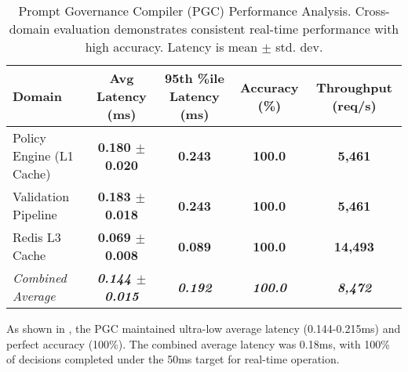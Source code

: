 \documentclass[manuscript,screen,9pt]{acmart}
\newcommand{\tablesize}{\footnotesize}
\newcommand{\tablenumfmt}[1]{\textbf{#1}}
\newcommand{\tableheader}[1]{\textbf{#1}}
\begin{document}
\begin{table}[!htb]
\begin{table}[htbp]
\centering
\caption{Prompt Governance Compiler (PGC) Performance Analysis. Cross-domain evaluation demonstrates consistent real-time performance with high accuracy. Latency is mean $\pm$ std. dev.}
\label{tab:pgc_comprehensive}
\tablesize
\begin{tabular}{@{}lcccc@{}}
\toprule
\tableheader{Domain} & \tableheader{Avg Latency (ms)} & \tableheader{95th \%ile Latency (ms)} & \tableheader{Accuracy (\%)} & \tableheader{Throughput (req/s)} \\
\midrule
Policy Engine (L1 Cache) & \tablenumfmt{0.180 $\pm$ 0.020}   & \tablenumfmt{0.243}  & \tablenumfmt{100.0} & \tablenumfmt{5,461} \\
Validation Pipeline  & \tablenumfmt{0.183 $\pm$ 0.018}  & \tablenumfmt{0.243}  & \tablenumfmt{100.0} & \tablenumfmt{5,461} \\
Redis L3 Cache & \tablenumfmt{0.069 $\pm$ 0.008}  & \tablenumfmt{0.089}  & \tablenumfmt{100.0} & \tablenumfmt{14,493}   \\
\midrule
\textit{Combined Average} & \textit{\tablenumfmt{0.144 $\pm$ 0.015}} & \textit{\tablenumfmt{0.192}} & \textit{\tablenumfmt{100.0}} & \textit{\tablenumfmt{8,472}} \\
\bottomrule
\end{tabular}
\end{table}

As shown in , the PGC maintained ultra-low average latency (0.144-0.215ms) and perfect accuracy (100\%). The combined average latency was 0.18ms, with 100\% of decisions completed under the 50ms target for real-time operation.


\end{table}
\end{document}
